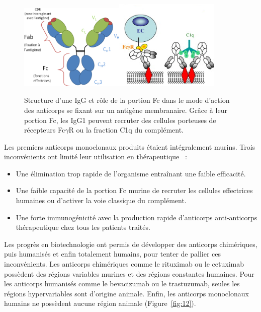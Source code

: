 \begin{figure}[htbp]
	\centering
		\includegraphics[width=5cm]{figures/raster/FIG_11a}\includegraphics[width=5cm]{figures/raster/FIG_11b}
	\caption[Structure d'une IgG et rôle de la portion Fc.]{Structure d'une IgG et rôle de la portion Fc dans le mode d'action des anticorps se fixant sur un antigène membranaire. Grâce à leur portion Fc, les IgG1 peuvent recruter des cellules porteuses de récepteurs Fc$\gamma$R ou la fraction C1q du complément.}
	\label{fig:11}
\end{figure}

Les premiers anticorps monoclonaux produits étaient intégralement murins. Trois inconvénients ont limité leur utilisation en thérapeutique~\citep{REF17} :
\begin{itemize}
\item Une élimination trop rapide de l'organisme entraînant une faible efficacité.
\item Une faible capacité de la portion Fc murine de recruter les cellules effectrices humaines ou d'activer la voie classique du complément.
\item Une forte immunogénicité avec la production rapide d'anticorps anti-anticorps thérapeutique chez tous les patients traités.
\end{itemize}
Les progrès en biotechnologie ont permis de développer des anticorps chimériques, puis humanisés et enfin totalement humains, pour tenter de pallier ces inconvénients. Les anticorps chimériques comme le rituximab ou le cetuximab possèdent des régions variables murines et des régions constantes humaines. Pour les anticorps humanisés comme le bevacizumab ou le trastuzumab, seules les régions hypervariables sont d'origine animale. Enfin, les anticorps monoclonaux humains ne possèdent aucune région animale (Figure~\ref{fig:12}).

